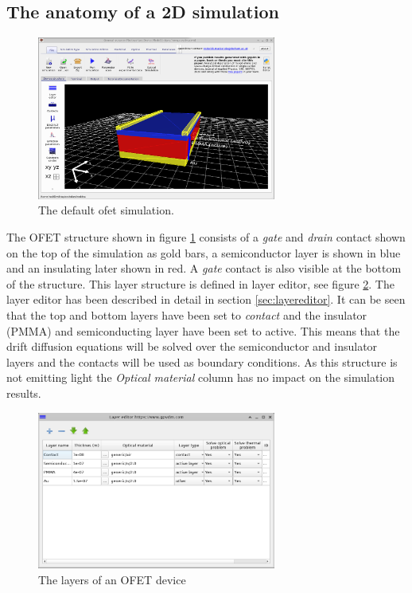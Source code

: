 \subsection{The anatomy of a 2D simulation}

\begin{figure}[H]
\centering
\includegraphics[width=0.7\textwidth]{./images/ofet_1.png}
\caption{The default ofet simulation.}
\label{fig:ofetstartsim}
\end{figure}

The OFET structure shown in figure \ref{fig:ofetstartsim} consists of a \emph{gate} and \emph{drain} contact shown on the top of the simulation as gold bars, a semiconductor layer is shown in blue and an insulating later shown in red.  A \emph{gate} contact is also visible at the bottom of the structure.  This layer structure is defined in layer editor, see figure \ref{fig:ofetlayerstructure}. The layer editor has been described in detail in section \ref{sec:layereditor}. It can be seen that the top and bottom layers have been set to \emph{contact} and the insulator (PMMA) and semiconducting layer have been set to active. This means that the drift diffusion equations will be solved over the semiconductor and insulator layers and the contacts will be used as boundary conditions.  As this structure is not emitting light the \emph{Optical material} column has no impact on the simulation results.



\begin{figure}[H]
\centering
\includegraphics[width=0.7\textwidth]{./images/ofet_2.png}
\caption{The layers of an OFET device}
\label{fig:ofetlayerstructure}
\end{figure}

